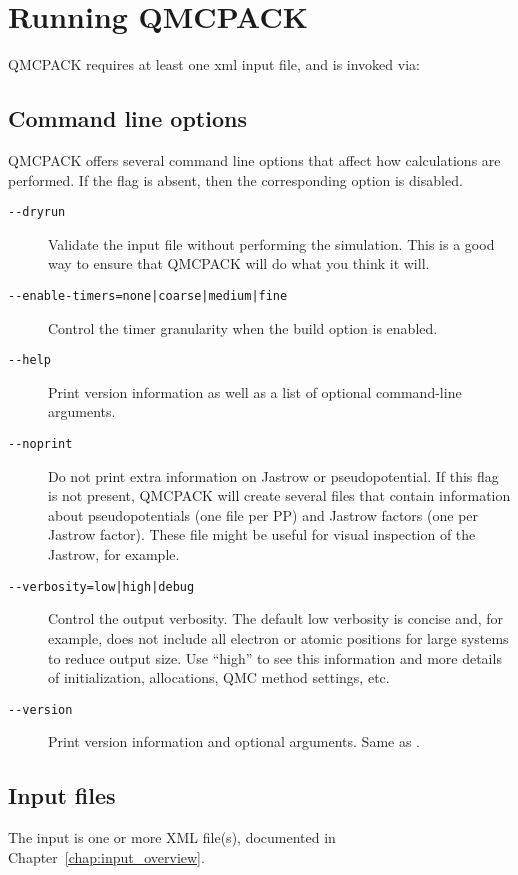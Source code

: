 \chapter{Running QMCPACK}
\label{chap:running}

QMCPACK requires at least one xml input file, and is invoked via:

{}

\section{Command line options}
\label{sec:commandline}
QMCPACK offers several command line options that affect how calculations
are performed. If the flag is absent, then the corresponding
option is disabled.

\begin{description}
\item[\texttt{-{}-dryrun}]{ Validate the input file without performing the simulation.
  This is a good way to ensure that QMCPACK will do what you think it will. }
\item[\texttt{-{}-enable-timers=none|coarse|medium|fine}]{ Control the timer granularity
  when the build option  is enabled. }
\item[\texttt{-{}-help}]{ Print version information as well as a list of optional
  command-line arguments. }
\item[\texttt{-{}-noprint}]{ Do not print extra information on Jastrow or pseudopotential.
  If this flag is not present, QMCPACK will create several  files
  that contain information about pseudopotentials (one file per PP) and Jastrow
  factors (one per Jastrow factor). These file might be useful for visual inspection
  of the Jastrow, for example. }
\item[\texttt{-{}-verbosity=low|high|debug}]{ Control the output verbosity. The default low verbosity is concise and, for example, does not include all electron or atomic positions for large systems to reduce output size. Use ``high'' to see this information and more details of initialization, allocations, QMC method settings, etc. }
\item[\texttt{-{}-version}]{ Print version information and optional arguments.
  Same as . }
\end{description}


\section{Input files}
\label{sec:inputs}
The input is one or more XML file(s), documented in Chapter~\ref{chap:input_overview}.


